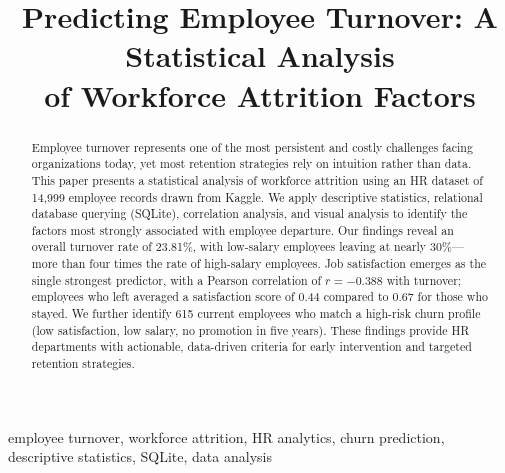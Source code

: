 \documentclass[conference]{IEEEtran}
\begin{document}
\title{Predicting Employee Turnover: A Statistical Analysis\\of Workforce Attrition Factors}

\author{
}

\maketitle

\begin{abstract}
Employee turnover represents one of the most persistent and costly challenges
facing organizations today, yet most retention strategies rely on intuition
rather than data. This paper presents a statistical analysis of workforce
attrition using an HR dataset of 14,999 employee records drawn from Kaggle.
We apply descriptive statistics, relational database querying (SQLite),
correlation analysis, and visual analysis to identify the factors most
strongly associated with employee departure. Our findings reveal an overall
turnover rate of 23.81\%, with low-salary employees leaving at nearly
30\%---more than four times the rate of high-salary employees. Job
satisfaction emerges as the single strongest predictor, with a Pearson
correlation of $r = -0.388$ with turnover; employees who left averaged a
satisfaction score of 0.44 compared to 0.67 for those who stayed. We further
identify 615 current employees who match a high-risk churn profile (low
satisfaction, low salary, no promotion in five years). These findings provide
HR departments with actionable, data-driven criteria for early intervention
and targeted retention strategies.
\end{abstract}

\begin{IEEEkeywords}
employee turnover, workforce attrition, HR analytics, churn prediction,
descriptive statistics, SQLite, data analysis
\end{IEEEkeywords}

\end{document}
